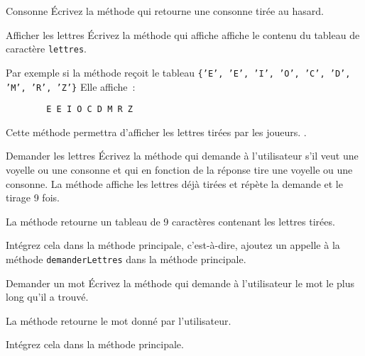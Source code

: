 \documentclass[a4paper,11pt]{article}
\begin{document}
 	\begin{Exercice}{Consonne}
		\'Ecrivez la méthode  qui retourne une consonne 
		tirée au hasard.
	\end{Exercice} 

 	\begin{Exercice}{Afficher les lettres}
 		\'Ecrivez la méthode 
		qui affiche affiche le contenu du tableau de caractère \texttt{lettres}.
		
		Par exemple si la méthode reçoit le tableau 
		\texttt{\{'E', 'E', 'I', 'O', 'C', 'D', 'M', 'R', 'Z'\}}
		Elle affiche~:
		
		\begin{verbatim}
		E E I O C D M R Z
		\end{verbatim}
		
		Cette méthode permettra d'afficher les lettres tirées par les joueurs.
.
	\end{Exercice} 

 	\begin{Exercice}{Demander les lettres}
		\'Ecrivez la méthode 
		qui demande à l'utilisateur s'il veut une voyelle ou une consonne
		et qui en fonction de la réponse tire une voyelle ou une consonne.
		La méthode affiche les lettres déjà tirées et répète la demande
		et le tirage 9 fois.
		 
		La méthode retourne un tableau de 9 caractères contenant les lettres tirées. 
		
		Intégrez cela dans la méthode principale, c'est-à-dire, ajoutez un appelle à 
		la méthode \texttt{demanderLettres} dans la méthode principale.
	\end{Exercice} 

	
 	\begin{Exercice}{Demander un mot}
		\'Ecrivez la méthode 
		qui demande à l'utilisateur le mot le plus long qu'il a trouvé.
		 
		La méthode retourne le mot donné par l'utilisateur. 
		
		Intégrez cela dans la méthode principale.
	\end{Exercice} 
	
\end{document}
